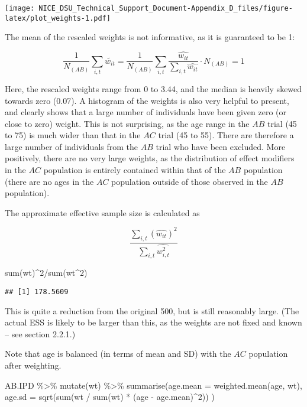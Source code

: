 \documentclass[
]{article}
\newenvironment{Shaded}{\begin{snugshade}}{\end{snugshade}}
\newcommand{\AttributeTok}[1]{\textcolor[rgb]{0.77,0.63,0.00}{#1}}
\newcommand{\DecValTok}[1]{\textcolor[rgb]{0.00,0.00,0.81}{#1}}
\newcommand{\FunctionTok}[1]{\textcolor[rgb]{0.00,0.00,0.00}{#1}}
\newcommand{\NormalTok}[1]{#1}
\newcommand{\SpecialCharTok}[1]{\textcolor[rgb]{0.00,0.00,0.00}{#1}}
\begin{document}
\texttt{[image: NICE\_DSU\_Technical\_Support\_Document-Appendix\_D\_files/figure-latex/plot\_weights-1.pdf]}

The mean of the rescaled weights is not informative, as it is guaranteed
to be 1:

\[\frac{1}{N_{(AB)}}\sum_{i,t}\tilde{w_{it}}=\frac{1}{N_{(AB)}}\sum_{i,t}\frac{\hat{w_{it}}}{\sum_{i,t}\hat{w_{it}}}\cdot N_{(AB)}=1\]

Here, the rescaled weights range from 0 to 3.44, and the median is
heavily skewed towards zero (0.07). A histogram of the weights is also
very helpful to present, and clearly shows that a large number of
individuals have been given zero (or close to zero) weight. This is not
surprising, as the age range in the \(AB\) trial (45 to 75) is much
wider than that in the \(AC\) trial (45 to 55). There are therefore a
large number of individuals from the \(AB\) trial who have been
excluded. More positively, there are no very large weights, as the
distribution of effect modifiers in the \(AC\) population is entirely
contained within that of the \(AB\) population (there are no ages in the
\(AC\) population outside of those observed in the \(AB\) population).

The approximate effective sample size is calculated as

\[\frac{\sum_{i,t}(\hat{w_{it}})^2}{\sum_{i,t}\hat{w_{i,t}^2}}\]

\begin{Shaded}
\begin{Highlighting}[]
\FunctionTok{sum}\NormalTok{(wt)}\SpecialCharTok{\^{}}\DecValTok{2}\SpecialCharTok{/}\FunctionTok{sum}\NormalTok{(wt}\SpecialCharTok{\^{}}\DecValTok{2}\NormalTok{)}
\end{Highlighting}
\end{Shaded}

\begin{verbatim}
## [1] 178.5609
\end{verbatim}

This is quite a reduction from the original 500, but is still reasonably
large. (The actual ESS is likely to be larger than this, as the weights
are not fixed and known -- see section 2.2.1.)

Note that age is balanced (in terms of mean and SD) with the \(AC\)
population after weighting.

\begin{Shaded}
\begin{Highlighting}[]
\NormalTok{AB.IPD }\SpecialCharTok{\%\textgreater{}\%}
  \FunctionTok{mutate}\NormalTok{(wt) }\SpecialCharTok{\%\textgreater{}\%}
  \FunctionTok{summarise}\NormalTok{(}\AttributeTok{age.mean =} \FunctionTok{weighted.mean}\NormalTok{(age, wt),}
            \AttributeTok{age.sd =} \FunctionTok{sqrt}\NormalTok{(}\FunctionTok{sum}\NormalTok{(wt }\SpecialCharTok{/} \FunctionTok{sum}\NormalTok{(wt) }\SpecialCharTok{*}\NormalTok{ (age }\SpecialCharTok{{-}}\NormalTok{ age.mean)}\SpecialCharTok{\^{}}\DecValTok{2}\NormalTok{))}
\NormalTok{)}
\end{Highlighting}
\end{Shaded}
\end{document}
